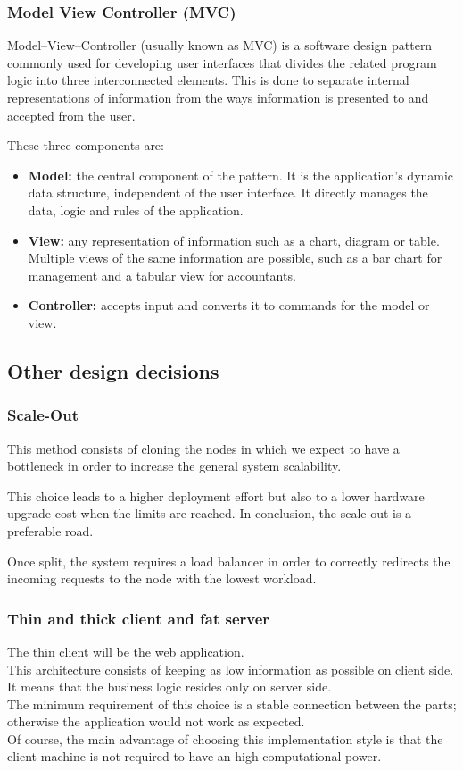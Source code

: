 \subsubsection{Model View Controller (MVC)}
Model--View--Controller (usually known as MVC) is a software design pattern commonly used for developing user interfaces that divides the related program logic into three interconnected elements. This is done to separate internal representations of information from the ways information is presented to and accepted from the user.

These three components are:
\begin{itemize}
    \item \textbf{Model:} the central component of the pattern. It is the application's dynamic data structure, independent of the user interface. It directly manages the data, logic and rules of the application.
    \item \textbf{View:} any representation of information such as a chart, diagram or table. Multiple views of the same information are possible, such as a bar chart for management and a tabular view for accountants.
    \item \textbf{Controller:} accepts input and converts it to commands for the model or view.
\end{itemize}

\subsection{Other design decisions}
\subsubsection{Scale-Out}
This method consists of cloning the nodes in which we expect to have a bottleneck in order to increase the general system scalability.

This choice leads to a higher deployment effort but also to a lower hardware upgrade cost when the limits are reached. In conclusion, the scale-out is a preferable road.

Once split, the system requires a load balancer in order to correctly redirects the incoming requests to the node with the lowest workload.

\subsubsection{Thin and thick client and fat server}
The thin client will be the web application.\\
This architecture consists of keeping as low information as possible on client side. It means that the business logic resides only on server side.\\
The minimum requirement of this choice is a stable connection between the parts; otherwise the application would not work as expected.\\
Of course, the main advantage of choosing this implementation style is that the client machine is not required to have an high computational power.

